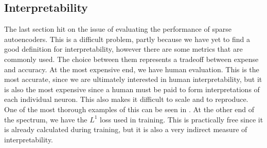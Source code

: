 \documentclass[../../main.tex]{subfiles}
\begin{document}

\subsection{Interpretability}
The last section hit on the issue of evaluating the performance of sparse autoencoders.
This is a difficult problem, partly because we have yet to find a good definition for interpretability, however there are some metrics that are commonly used.
The choice between them represents a tradeoff between expense and accuracy.
At the most expensive end, we have human evaluation.
This is the most accurate, since we are ultimately interested in human interpretability, but it is also the most expensive since a human must be paid to form interpretations of each individual neuron.
This also makes it difficult to scale and to reproduce.
One of the most thorough examples of this can be seen in \citet{bricken_towards_2023}.
At the other end of the spectrum, we have the $L^1$ loss used in training.
This is practically free since it is already calculated during training, but it is also a very indirect measure of interpretability.





\end{document}
